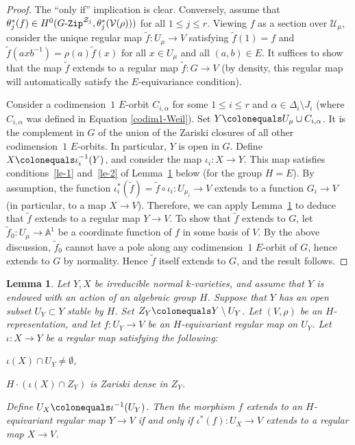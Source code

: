 \documentclass[11pt]{amsart}
\numberwithin{equation}{section}
\newtheorem{lemma}[theorem]{Lemma}
\theoremstyle{definition}
\theoremstyle{remark}
\newcommand{\GZip}{\mathop{\text{$G$-{\tt Zip}}}\nolimits}
\newcommand{\Ucal}{{\mathcal U}}
\newcommand{\Vcal}{{\mathcal V}}
\newcommand{\Zcal}{{\mathcal Z}}
\renewcommand{\AA}{\mathbb{A}}
\begin{document}
\begin{proof}
The ``only if''  implication is clear. Conversely, assume that $\theta_j^*(f) \in H^0(\GZip^{\Zcal_j}, \theta_j^*(\Vcal(\rho)))$ for all $1\leq j \leq r$. 
Viewing $f$ as a section over $\Ucal_\mu$, consider the unique regular map $\widetilde{f}\colon U_\mu \to V$ satisfying $\widetilde{f}(1)=f$ and $\widetilde{f}(axb^{-1})=\rho(a)\widetilde{f}(x)$ for all $x\in U_{\mu}$ and all $(a,b)\in E$. It suffices to show that the map $\widetilde{f}$ extends to a regular map $\widetilde{f}\colon G\to V$ (by density, this regular map will automatically satisfy the $E$-equivariance condition).

Consider a codimension~$1$ $E$-orbit $C_{i,\alpha}$ for some $1\leq i \leq r$ and $\alpha\in \Delta_i\setminus J_i$ (where $C_{i,\alpha}$ was defined in Equation \eqref{codim1-Weil}). Set $Y\colonequals U_\mu \cup C_{i,\alpha}$. It is the complement in $G$ of the union of the Zariski closures of all other codimension~$1$ $E$-orbits. In particular, $Y$ is open in $G$. Define $X\colonequals \iota_i^{-1}(Y)$, and consider the map $\iota_i\colon X\to Y$. This map satisfies conditions~\eqref{le-1} and~\eqref{le-2} of Lemma~\ref{lem-extends} below (for the group $H=E$). By assumption, the function $\iota_i^*(\widetilde{f})=\widetilde{f} \circ \iota_i \colon U_{\mu_i} \to V$ extends to a function $G_i\to V$ (in particular, to a map $X\to V$). Therefore, we can apply Lemma~\ref{lem-extends} to deduce that $\widetilde{f}$ extends to a regular map $Y\to V$. To show that $\widetilde{f}$ extends to $G$, let $\widetilde{f}_0\colon U_\mu\to \AA^1$ be a coordinate function of $f$ in some basis of $V$. By the above discussion, $\widetilde{f}_0$ cannot have a pole along any codimension~$1$ $E$-orbit of $G$, hence extends to $G$ by normality. Hence $\widetilde{f}$ itself extends to $G$, and the result follows.
\end{proof}


\begin{lemma}\label{lem-extends}
Let $Y,X$ be irreducible normal $k$-varieties, and assume that $Y$ is endowed with an action of an algebraic group $H$. Suppose that $Y$ has an open subset $U_Y\subset Y$ stable by $H$. Set $Z_Y \colonequals Y\setminus U_Y$. Let $(V,\rho)$ be an $H$-representation, and let $f\colon U_Y\to V$ be an $H$-equivariant regular map on $U_Y$. Let $\iota\colon X\to Y$ be a regular map satisfying the following:
\begin{assertionlist}
\item\label{le-1} $\iota(X)\cap U_Y \neq \emptyset$,
\item\label{le-2} $H\cdot(\iota(X)\cap Z_Y)$ is Zariski dense in $Z_Y$.
\end{assertionlist}
Define $U_X\colonequals \iota^{-1}(U_Y)$. Then the morphism $f$ extends to an $H$-equivariant regular map $Y\to V$ if and only if $\iota^*(f)\colon U_X\to V$ extends to a regular map $X\to V$.
\end{lemma}
\end{document}

